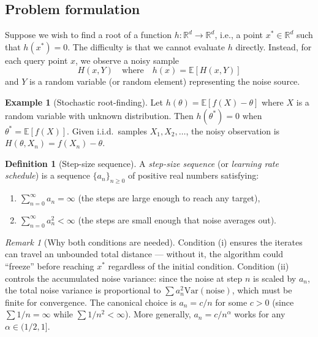 \documentclass[11pt,a4paper]{article}
\theoremstyle{definition}
\newtheorem{definition}{Definition}[section]
\newtheorem{example}{Example}[section]
\theoremstyle{plain}
\theoremstyle{remark}
\newtheorem{remark}{Remark}[section]
\newcommand{\R}{\mathbb{R}}
\newcommand{\E}{\mathbb{E}}
\newcommand{\Var}{\mathrm{Var}}
\begin{document}
\subsection{Problem formulation}

Suppose we wish to find a root of a function $h : \R^d \to \R^d$, i.e., a point
$x^* \in \R^d$ such that $h(x^*) = 0$. The difficulty is that we cannot evaluate $h$
directly. Instead, for each query point $x$, we observe a noisy sample
\[
  H(x, Y) \quad \text{where} \quad h(x) = \E[H(x, Y)]
\]
and $Y$ is a random variable (or random element) representing the noise source.

\begin{example}[Stochastic root-finding]
\label{ex:root-finding}
Let $h(\theta) = \E[f(X) - \theta]$ where $X$ is a random variable with unknown
distribution. Then $h(\theta^*) = 0$ when $\theta^* = \E[f(X)]$. Given i.i.d.\ samples
$X_1, X_2, \ldots$, the noisy observation is $H(\theta, X_n) = f(X_n) - \theta$.
\end{example}

\begin{definition}[Step-size sequence]
\label{def:step-size}
A \emph{step-size sequence} (or \emph{learning rate schedule}) is a sequence
$\{a_n\}_{n \geq 0}$ of positive real numbers satisfying:
\begin{enumerate}[label=(\roman*)]
\item $\displaystyle\sum_{n=0}^{\infty} a_n = \infty$ \quad (the steps are large enough to reach any target),
\item $\displaystyle\sum_{n=0}^{\infty} a_n^2 < \infty$ \quad (the steps are small enough that noise averages out).
\end{enumerate}
\end{definition}

\begin{remark}[Why both conditions are needed]
\label{rem:step-size-intuition}
Condition (i) ensures the iterates can travel an unbounded total distance --- without
it, the algorithm could ``freeze'' before reaching $x^*$ regardless of the initial
condition. Condition (ii) controls the accumulated noise variance: since the noise at
step $n$ is scaled by $a_n$, the total noise variance is proportional to
$\sum a_n^2 \Var(\text{noise})$, which must be finite for convergence. The canonical
choice is $a_n = c / n$ for some $c > 0$ (since $\sum 1/n = \infty$ while
$\sum 1/n^2 < \infty$). More generally, $a_n = c / n^\alpha$ works for any
$\alpha \in (1/2, 1]$.
\end{remark}
\end{document}

